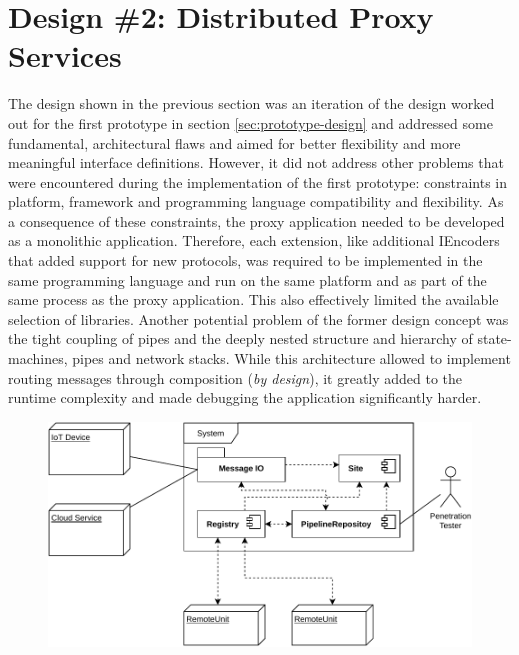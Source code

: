 \section{Design \#2: Distributed Proxy Services}
\label{sec:design-2}
The design shown in the previous section was an iteration of the design worked out for the first prototype in section \ref{sec:prototype-design} and addressed some fundamental, architectural flaws and aimed for better flexibility and more meaningful interface definitions. However, it did not address other problems that were encountered during the implementation of the first prototype: constraints in platform, framework and programming language compatibility and flexibility. As a consequence of these constraints, the proxy application needed to be developed as a monolithic application. Therefore, each extension, like additional IEncoders that added support for new protocols, was required to be implemented in the same programming language and run on the same platform and as part of the same process as the proxy application. This also effectively limited the available selection of libraries. Another potential problem of the former design concept was the tight coupling of pipes and the deeply nested structure and hierarchy of state-machines, pipes and network stacks. While this architecture allowed to implement routing messages through composition (\emph{by design}), it greatly added to the runtime complexity and made debugging the application significantly harder.
\begin{figure}[h]
    \centering
    \includegraphics[width=14cm]{img/ch05/component-view2-1.pdf}
    \label{fig:component-view2-1}
\end{figure}
